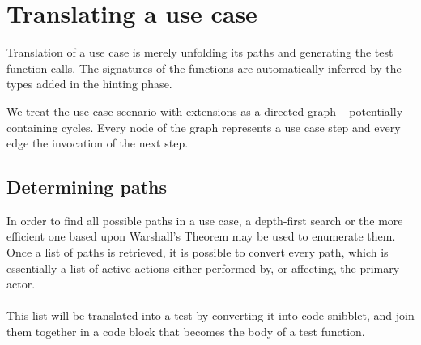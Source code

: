 \section{Translating a use case}
Translation of a use case is merely unfolding its paths and generating the test function calls. The signatures of the functions are automatically inferred by the types added in the hinting phase.

We treat the use case scenario with extensions as a directed graph -- potentially containing cycles. Every node of the graph represents a use case step and every edge the invocation of the next step.

\subsection{Determining paths}
In order to find all possible paths in a use case, a depth-first search or the more efficient one based upon Warshall's Theorem\cite{rubin1978enumerating} may be used to enumerate them. Once a list of paths is retrieved, it is possible to convert every path, which is essentially a list of active actions either performed by, or affecting, the primary actor.\\\\
This list will be translated into a test by converting it into code snibblet, and join them together in a code block that becomes the body of a test function.
